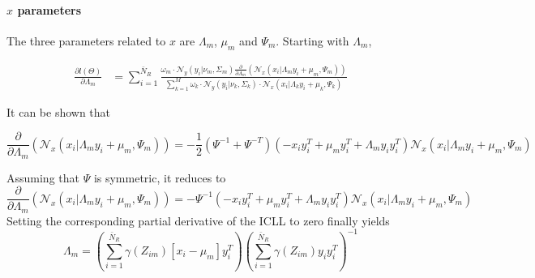 \paragraph{$x$ parameters}
The three parameters related to $x$ are $\Lambda_m$, $\mu_m$ and $\Psi_m$. Starting with $\Lambda_m$,

\begin{align}
\frac{\partial l(\Theta)}{\partial \Lambda_m} &= \sum\limits_{i = 1}^{\bar{N}_R}
\frac{\omega_m\cdot
\mathcal{N}_y\left(y_i\vert\nu_m,\Sigma_m\right)\frac{\partial }{\partial \Lambda_m}\left(\mathcal{N}_x\left(x_i\vert\Lambda_my_i + \mu_m,\Psi_m\right)\right)}{\sum\limits_{k = 1}^{M}\omega_k\cdot
\mathcal{N}_y\left(y_i\vert\nu_k,\Sigma_k\right)\cdot\mathcal{N}_x\left(x_i\vert\Lambda_ky_i + \mu_k,\Psi_k\right) }
\end{align}

It can be shown that 

\begin{equation}
\frac{\partial }{\partial \Lambda_m}\left(\mathcal{N}_x\left(x_i\vert\Lambda_my_i + \mu_m,\Psi_m\right)\right) = - \frac{1}{2}\left(\Psi^{-1} + \Psi^{-T}\right)\left(-x_iy_i^T + \mu_my_i^T + \Lambda_my_iy_i^T\right)\mathcal{N}_x\left(x_i\vert\Lambda_my_i + \mu_m,\Psi_m\right)
\end{equation}

Assuming that $\Psi$ is symmetric, it reduces to
\begin{equation}
\frac{\partial }{\partial \Lambda_m}\left(\mathcal{N}_x\left(x_i\vert\Lambda_my_i + \mu_m,\Psi_m\right)\right) = -\Psi^{-1}\left(-x_iy_i^T + \mu_my_i^T + \Lambda_my_iy_i^T\right)\mathcal{N}_x\left(x_i\vert\Lambda_my_i + \mu_m,\Psi_m\right)
\end{equation}
Setting the corresponding partial derivative of the ICLL to zero finally yields
\begin{equation}
\boxed{
\Lambda_m =\left(
\sum\limits_{i = 1}^{\bar{N}_R}\gamma(Z_{im})\left[x_i - \mu_m\right]y_i^T\right) \left( \sum\limits_{i = 1}^{\bar{N}_R}\gamma(Z_{im})y_iy_i^T\right)^{-1}
}
\end{equation}

